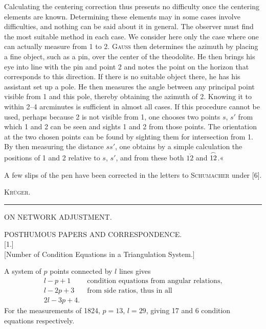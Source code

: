 Calculating the centering correction thus presents no difficulty once the centering elements are known. Determining these elements may in some cases involve difficulties, and nothing can be said about it in general. The observer must find the most suitable method in each case. We consider here only the case where one can actually measure from 1 to 2. \textsc{Gauss} then determines the azimuth by placing a fine object, such as a pin, over the center of the theodolite. He then brings his eye into line with the pin and point 2 and notes the point on the horizon that corresponds to this direction. If there is no suitable object there, he has his assistant set up a pole. He then measures the angle between any principal point visible from 1 and this pole, thereby obtaining the azimuth of 2. Knowing it to within 2--4 arcminutes is sufficient in almost all cases. If this procedure cannot be used, perhaps because 2 is not visible from 1, one chooses two points $s$, $s'$ from which 1 and 2 can be seen and sights 1 and 2 from those points. The orientation at the two chosen points can be found by sighting them for intersection from 1. By then measuring the distance $ss'$, one obtains by a simple calculation the positions of 1 and 2 relative to $s$, $s'$, and from these both $\overline{12}$ and $\overset{\frown}{12}$.«

\medskip
A few slips of the pen have been corrected in the letters to \textsc{Schumacher} under [6].

\hfill\textsc{Krüger.}
\vfill
\begin{center}\rule{4cm}{.4pt}\end{center}

\clearpage\null
\clearpage
\vspace*{\fill}
\begin{center}{\LARGE ON NETWORK ADJUSTMENT.}\end{center}
\vfill
\clearpage\null
\clearpage
\begin{center}
{\Large POSTHUMOUS PAPERS AND CORRESPONDENCE.}\\[2cm]
[1.]\\[3pt]
[Number of Condition Equations in a Triangulation System.]
\end{center}
A system of $p$ points connected by $l$ lines gives
\[
\begin{aligned}
l-p+1\quad&\text{condition equations from angular relations,}\\
l-2p+3\quad&\text{from side ratios, thus in all}\\
2l-3p+4.&
\end{aligned}
\]
\noindent{}\indent For the measurements of 1824, $p=13$, $l=29$, giving 17 and 6 condition equations respectively.

